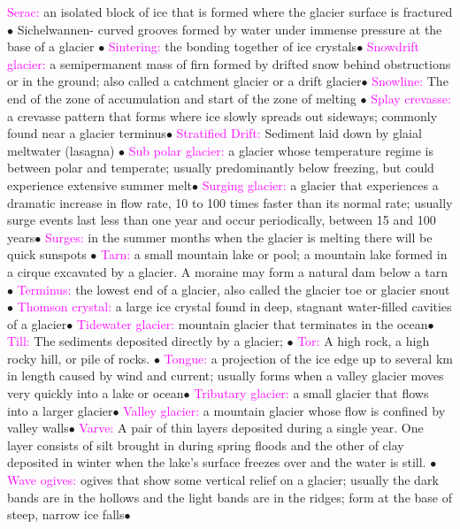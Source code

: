 \documentclass{article}
\newcommand{\ddd}{$\bullet$}
\newcommand{\pink}[1]{\textcolor{magenta}{#1}}
\newcommand{\vocab}[1]{{\pink{#1}}}
\begin{document}
\begin{multicols*}{4}
		\vocab{        Serac: } an isolated block of ice that is formed where the glacier surface is fractured\ddd
		\vocab{ }        Sichelwannen- curved grooves formed by water under immense pressure at the base of a glacier \ddd
		\vocab{        Sintering: } the bonding together of ice crystals\ddd
		\vocab{        Snowdrift glacier: } a semipermanent mass of firn formed by drifted snow behind obstructions or in the ground; also called a catchment glacier or a drift glacier\ddd
		\vocab{Snowline: } The end of the zone of accumulation and start of the zone of melting \ddd
		\vocab{        Splay crevasse: } a crevasse pattern that forms where ice slowly spreads out sideways; commonly found near a glacier terminus\ddd
		\vocab{Stratified Drift: } Sediment laid down by glaial meltwater (lasagna) \ddd
		\vocab{        Sub polar glacier: } a glacier whose temperature regime is between polar and temperate; usually predominantly below freezing, but could experience extensive summer melt\ddd
		\vocab{        Surging glacier: } a glacier that experiences a dramatic increase in flow rate, 10 to 100 times faster than its normal rate; usually surge events last less than one year and occur periodically, between 15 and 100 years\ddd
		\vocab{Surges: } in the summer months when the glacier is melting there will be quick sunspots \ddd
		\vocab{        Tarn: } a small mountain lake or pool; a mountain lake formed in a cirque excavated by a glacier. A moraine may form a natural dam below a tarn\ddd
		\vocab{        Terminus: } the lowest end of a glacier, also called the glacier toe or glacier snout\ddd
		\vocab{        Thomson crystal: } a large ice crystal found in deep, stagnant water-filled cavities of a glacier\ddd
		\vocab{        Tidewater glacier: } mountain glacier that terminates in the ocean\ddd
		\vocab{Till: } The sediments deposited directly by a glacier; \ddd
		\vocab{Tor: } A high rock, a high rocky hill, or pile of rocks. \ddd
		\vocab{        Tongue: } a projection of the ice edge up to several km in length caused by wind and current; usually forms when a valley glacier moves very quickly into a lake or ocean\ddd
		\vocab{        Tributary glacier: } a small glacier that flows into a larger glacier\ddd
		\vocab{        Valley glacier: } a mountain glacier whose flow is confined by valley walls\ddd
		\vocab{Varve: } A pair of thin layers deposited during a single year. One layer consists of silt brought in during spring floods and the other of clay deposited in winter when the lake's surface freezes over and the water is still. \ddd
		\vocab{        Wave ogives: } ogives that show some vertical relief on a glacier; usually the dark bands are in the hollows and the light bands are in the ridges; form at the base of steep, narrow ice falls\ddd

\end{multicols*}
\end{document}
